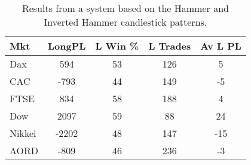 \begin{table}[ht]
\centering
\caption[Results from a system based on the Hammer and Inverted Hammer candlestick patterns]{Results from a system based on the Hammer and Inverted Hammer candlestick patterns.} 
\label{tab:hammer_results}
\begin{tabular}{lcccc}
  \toprule Mkt & LongPL & L Win \% & L Trades & Av L PL \\ 
  \midrule Dax & 594 & 53 & 126 & 5 \\ 
  CAC & -793 & 44 & 149 & -5 \\ 
  FTSE & 834 & 58 & 188 & 4 \\ 
  Dow & 2097 & 59 & 88 & 24 \\ 
  Nikkei & -2202 & 48 & 147 & -15 \\ 
  AORD & -809 & 46 & 236 & -3 \\ 
   \bottomrule \end{tabular}
\end{table}

